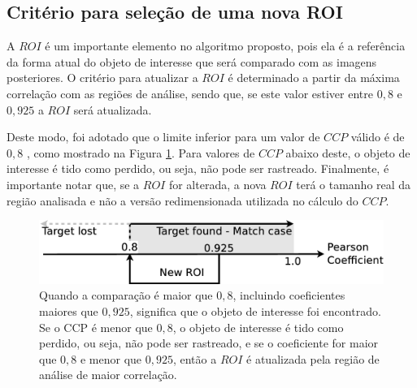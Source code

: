 \subsection{Critério para seleção de uma nova ROI}

A $ROI$ é um importante elemento no algoritmo proposto, pois ela é a referência da
forma atual do objeto de interesse que será comparado com as imagens posteriores.
O critério para atualizar a $ROI$ é determinado a partir da máxima correlação 
com as regiões de análise, sendo que, se este valor estiver entre $0,8$ 
e $0,925$ a $ROI$ será atualizada.

Deste modo, foi adotado que o limite inferior para um valor de $CCP$ válido é 
de $0,8$ \cite{Eugene}, como mostrado na Figura \ref{fig:newroicri}. Para valores
de $CCP$ abaixo deste, o objeto de interesse é tido como perdido, ou seja, não pode ser rastreado.
Finalmente, é importante notar que, se a $ROI$ for alterada, a nova $ROI$ terá 
o tamanho real da região analisada e não a versão redimensionada utilizada no cálculo do $CCP$.


\begin{figure}[H]
\includegraphics[width=\columnwidth]{images/figure3.eps}
\caption{Quando a comparação é maior que $0,8$, incluindo coeficientes maiores que $0,925$, 
significa que o objeto de interesse foi encontrado.
Se o CCP é menor que $0,8$, o objeto de interesse é tido como perdido, 
ou seja, não pode ser rastreado, e se o coeficiente for maior que $0,8$ 
e menor que $0,925$, então a $ROI$ é atualizada pela região de análise de 
maior correlação.}
\label{fig:newroicri}
\end{figure}

